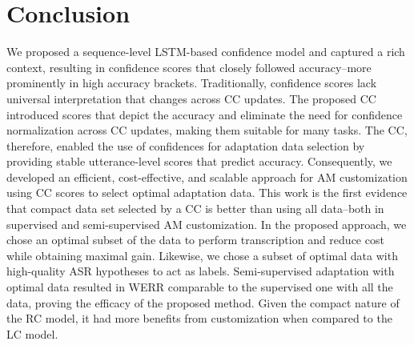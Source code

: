 \documentclass[a4paper]{article}
\begin{document}
\section{Conclusion}
\label{sec:conclusion}
We proposed a sequence-level LSTM-based confidence model and captured a rich context, resulting in confidence scores that closely followed accuracy--more prominently in high accuracy brackets. Traditionally, confidence scores lack universal interpretation that changes across CC updates. The proposed CC introduced scores that depict the accuracy and eliminate the need for confidence normalization across CC updates, making them suitable for many tasks. The CC, therefore, enabled the use of confidences for adaptation data selection by providing stable utterance-level scores that predict accuracy.  Consequently, we developed an efficient, cost-effective, and scalable approach for AM customization using CC scores to select optimal adaptation data. This work is the first evidence that compact data set selected by a CC is better than using all data--both in supervised and semi-supervised AM customization. In the proposed approach, we chose an optimal subset of the data to perform transcription and reduce cost while obtaining maximal gain. Likewise, we chose a subset of optimal data with high-quality ASR hypotheses to act as labels. Semi-supervised adaptation with optimal data resulted in WERR comparable to the supervised one with all the data, proving the efficacy of the proposed method.  Given the compact nature of the RC model, it had more benefits from customization when compared to the LC model.  



\end{document}
